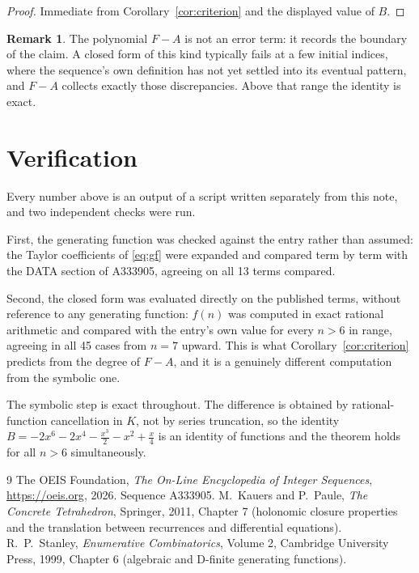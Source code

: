 \documentclass[11pt,a4paper]{article}
\theoremstyle{plain}
\theoremstyle{definition}
\newtheorem{remark}[theorem]{Remark}
\begin{document}
\begin{proof}
Immediate from Corollary~\ref{cor:criterion} and the displayed value of $B$.
\end{proof}

\begin{remark}
The polynomial $F-A$ is not an error term: it records the boundary of the claim. A closed
form of this kind typically fails at a few initial indices, where the sequence's own
definition has not yet settled into its eventual pattern, and $F-A$ collects exactly
those discrepancies. Above that range the identity is exact.
\end{remark}

\section{Verification}

Every number above is an output of a script written separately from this note, and two
independent checks were run.

First, the generating function was checked against the entry rather than assumed: the
Taylor coefficients of \eqref{eq:gf} were expanded and compared term by term with the DATA
section of A333905, agreeing on all 13 terms compared.

Second, the closed form was evaluated directly on the published terms, without reference
to any generating function: $f(n)$ was computed in exact rational arithmetic and compared
with the entry's own value for every $n>6$ in range, agreeing in all 45 cases
from $n=7$ upward. This is what Corollary~\ref{cor:criterion} predicts from the
degree of $F-A$, and it is a genuinely different computation from the symbolic one.

The symbolic step is exact throughout. The difference is obtained by rational-function
cancellation in $K$, not by series truncation, so the identity $B=- 2 x^{6} - 2 x^{4} - \frac{x^{3}}{2} - x^{2} + \frac{x}{4}$ is an
identity of functions and the theorem holds for all $n>6$ simultaneously.

\begin{thebibliography}{9}
 The OEIS Foundation, \emph{The On-Line Encyclopedia of Integer Sequences},
\url{https://oeis.org}, 2026. Sequence A333905.
 M.~Kauers and P.~Paule, \emph{The Concrete Tetrahedron}, Springer, 2011,
Chapter 7 (holonomic closure properties and the translation between recurrences and
differential equations).
 R.~P.~Stanley, \emph{Enumerative Combinatorics}, Volume 2, Cambridge
University Press, 1999, Chapter 6 (algebraic and D-finite generating functions).
\end{thebibliography}
\end{document}
